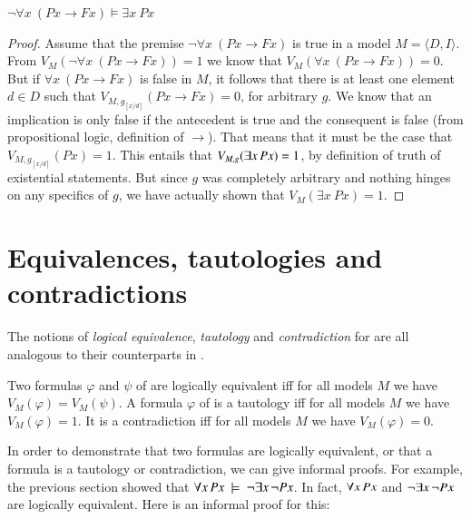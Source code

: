 \documentclass[nobib,nofonts]{tufte-handout}
\newcommand{\proplog}{\acro{PropLog}}
\newcommand{\predlog}{\acro{PredLog}}
\begin{document}
\begin{claim}
  $\neg \forall x \ (Px \rightarrow Fx) \models \exists x \ Px$
\end{claim}

\begin{proof}
  Assume that the premise $\neg \forall x \ (Px \rightarrow Fx)$ is true in a model $M = \langle D, I \rangle$.
  From $V_M(\neg \forall x \ (Px \rightarrow Fx))=1$ we know that $V_M(\forall x \ (Px \rightarrow Fx))=0$.
  But if $\forall x \ (Px \rightarrow Fx)$ is false in $M$, it follows that there is at least
  one element $d \in D$ such that $V_{M, g_{[x/d]}} (Px \rightarrow Fx) = 0$, for arbitrary $g$.
  We know that an implication is only false if the antecedent is true and the consequent is false (from propositional logic, definition of $\rightarrow$).
  That means that it must be the case that $V_{M, g_{[x/d]}}( Px ) = 1$.
  This entails that $V_{M, g} (\exists x \thinspace Px)=1$, by definition of truth of existential statements.
  But since $g$ was completely arbitrary and nothing hinges on any specifics of $g$, we have actually shown that $V_M(\exists x \ Px) =1$.
\end{proof}

\section{Equivalences, tautologies and contradictions}
\label{sec:equivl-taut-contr}

The notions of \emph{logical equivalence}, \emph{tautology} and \emph{contradiction} for \predlog are all analogous to their counterparts in \proplog.

Two formulas $\varphi$ and $\psi$ of \predlog are logically equivalent iff for all models $M$ we have $V_{M}(\varphi) = V_{M}(\psi)$. A formula $\varphi$ of \predlog is a tautology iff for all models $M$ we have $V_{M}(\varphi)=1$. It is a contradiction iff for all models $M$ we have $V_{M}(\varphi)=0$.

In order to demonstrate that two formulas are logically equivalent, or that a formula is a tautology or contradiction, we can give informal proofs. For example, the previous section showed that $\forall x \thinspace Px \ \models \ \neg \exists x \thinspace \neg Px$. In fact, $\forall x \thinspace Px$ and $\neg \exists x \thinspace \neg Px$ are logically equivalent. Here is an informal proof for this:
\end{document}
